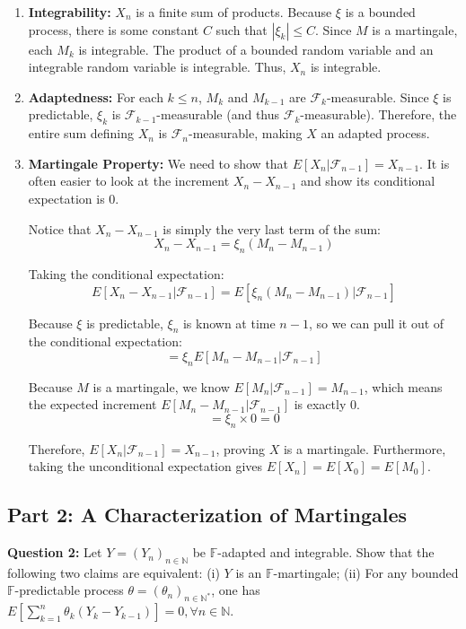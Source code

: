 \begin{enumerate}
    \item \textbf{Integrability:} $X_n$ is a finite sum of products. Because $\xi$ is a bounded process, there is some constant $C$ such that $|\xi_k| \le C$. Since $M$ is a martingale, each $M_k$ is integrable. The product of a bounded random variable and an integrable random variable is integrable. Thus, $X_n$ is integrable.
    
    \item \textbf{Adaptedness:} For each $k \le n$, $M_k$ and $M_{k-1}$ are $\mathcal{F}_k$-measurable. Since $\xi$ is predictable, $\xi_k$ is $\mathcal{F}_{k-1}$-measurable (and thus $\mathcal{F}_k$-measurable). Therefore, the entire sum defining $X_n$ is $\mathcal{F}_n$-measurable, making $X$ an adapted process.

    \item \textbf{Martingale Property:} We need to show that $E[X_n | \mathcal{F}_{n-1}] = X_{n-1}$. It is often easier to look at the increment $X_n - X_{n-1}$ and show its conditional expectation is 0.
    
    Notice that $X_n - X_{n-1}$ is simply the very last term of the sum:
    \[ X_n - X_{n-1} = \xi_n(M_n - M_{n-1}) \]
    
    Taking the conditional expectation:
    \[ E[X_n - X_{n-1} | \mathcal{F}_{n-1}] = E[\xi_n(M_n - M_{n-1}) | \mathcal{F}_{n-1}] \]
    
    Because $\xi$ is predictable, $\xi_n$ is known at time $n-1$, so we can pull it out of the conditional expectation:
    \[ = \xi_n E[M_n - M_{n-1} | \mathcal{F}_{n-1}] \]
    
    Because $M$ is a martingale, we know $E[M_n | \mathcal{F}_{n-1}] = M_{n-1}$, which means the expected increment $E[M_n - M_{n-1} | \mathcal{F}_{n-1}]$ is exactly 0.
    \[ = \xi_n \times 0 = 0 \]
    
    Therefore, $E[X_n | \mathcal{F}_{n-1}] = X_{n-1}$, proving $X$ is a martingale. Furthermore, taking the unconditional expectation gives $E[X_n] = E[X_0] = E[M_0]$.
\end{enumerate}

\subsection{Part 2: A Characterization of Martingales}

\textbf{Question 2:} Let $Y = (Y_n)_{n\in\mathbb{N}}$ be $\mathbb{F}$-adapted and integrable. Show that the following two claims are equivalent:
(i) $Y$ is an $\mathbb{F}$-martingale;
(ii) For any bounded $\mathbb{F}$-predictable process $\theta = (\theta_n)_{n\in\mathbb{N}^*}$, one has $E\left[\sum_{k=1}^n \theta_k(Y_k - Y_{k-1})\right] = 0, \forall n \in \mathbb{N}$.

